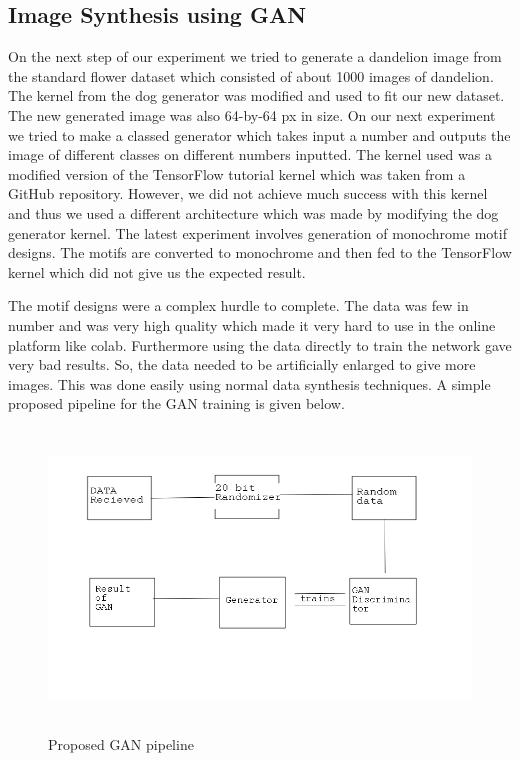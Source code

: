 \documentclass{article}
\begin{document}
    \subsection{Image Synthesis using GAN}
    
       On the next step of our experiment we tried to generate a dandelion image from the standard flower dataset which consisted of about 1000 images of dandelion. The kernel from the dog generator was modified and used to fit our new dataset. The new generated image was also 64-by-64 px in size.
    On our next experiment we tried to make a classed generator which takes input a number and outputs the image of different classes on different numbers inputted. The kernel used was a modified version of the TensorFlow tutorial kernel which was taken from a GitHub repository. However, we did not achieve much success with this kernel and thus we used a different architecture which was made by modifying the dog generator kernel.
    The latest experiment involves generation of monochrome motif designs. The motifs are converted to monochrome and then fed to the TensorFlow kernel which did not give us the expected result.
    
    The motif designs were a complex hurdle to complete. The data was few in number and was very high quality which made it very hard to use in the online platform like colab. Furthermore using the data directly to train the network gave very bad results. So, the data needed to be artificially enlarged to give more images. This was done easily using normal data synthesis techniques. A simple proposed pipeline for the GAN training is given below.
    
    \begin{figure}[H]
        \centering
        \includegraphics[height=8cm]{images/GAN/Generalworkflow.png}
        \caption{Proposed GAN pipeline}
    \end{figure}
    
\end{document}
